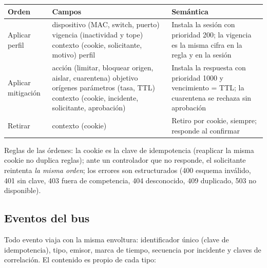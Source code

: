 \documentclass[11pt,a4paper]{article}
\begin{document}
\begin{longtable}{p{3.0cm}p{3.0cm}p{8.0cm}}
\toprule
\textbf{Orden} & \textbf{Campos} & \textbf{Semántica}\\
\midrule
Aplicar perfil & dispositivo (MAC, switch, puerto) \textperiodcentered{} vigencia (inactividad y tope) \textperiodcentered{} contexto (cookie, solicitante, motivo) \textperiodcentered{} perfil & Instala la sesión con prioridad 200; la vigencia es la misma cifra en la regla y en la sesión\\
Aplicar mitigación & acción (limitar, bloquear origen, aislar, cuarentena) \textperiodcentered{} objetivo \textperiodcentered{} orígenes \textperiodcentered{} parámetros (tasa, TTL) \textperiodcentered{} contexto (cookie, incidente, solicitante, aprobación) & Instala la respuesta con prioridad 1000 y vencimiento = TTL; la cuarentena se rechaza sin aprobación\\
Retirar & contexto (cookie) & Retiro por cookie, siempre; responde al confirmar\\
\bottomrule
\end{longtable}

Reglas de las órdenes: la cookie es la clave de idempotencia (reaplicar la misma cookie no duplica reglas); ante un controlador que no responde, el solicitante reintenta \emph{la misma orden}; los errores son estructurados (400 esquema inválido, 401 sin clave, 403 fuera de competencia, 404 desconocido, 409 duplicado, 503 no disponible).

\subsection{Eventos del bus}
Todo evento viaja con la misma envoltura: identificador único (clave de idempotencia), tipo, emisor, marca de tiempo, secuencia por incidente y claves de correlación. El contenido es propio de cada tipo:
\end{document}
